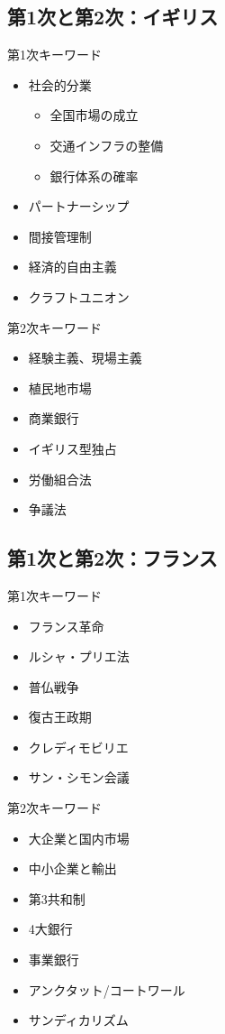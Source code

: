 \documentclass{jsarticle}
\begin{document}
\subsection{第1次と第2次：イギリス}
第1次キーワード
\begin{itemize}
\item 社会的分業
	\begin{itemize}
	\item 全国市場の成立
	\item 交通インフラの整備
	\item 銀行体系の確率
	\end{itemize}
\item パートナーシップ
\item 間接管理制
\item 経済的自由主義
\item クラフトユニオン
\end{itemize}
第2次キーワード
\begin{itemize}
\item 経験主義、現場主義
\item 植民地市場
\item 商業銀行
\item イギリス型独占
\item 労働組合法
\item 争議法
\end{itemize}

\subsection{第1次と第2次：フランス}
第1次キーワード
\begin{itemize}
\item フランス革命
\item ルシャ・プリエ法
\item 普仏戦争
\item 復古王政期
\item クレディモビリエ
\item サン・シモン会議
\end{itemize}
第2次キーワード
\begin{itemize}
\item 大企業と国内市場
\item 中小企業と輸出
\item 第3共和制
\item 4大銀行
\item 事業銀行
\item アンクタット/コートワール
\item サンディカリズム
\end{itemize}
\end{document}
